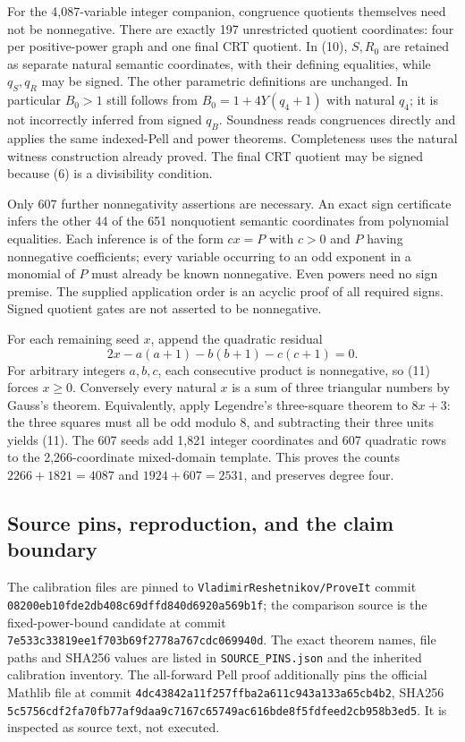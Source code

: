 \documentclass[11pt]{article}
\begin{document}
For the 4,087-variable integer companion, congruence quotients themselves
need not be nonnegative.  There are exactly 197 unrestricted quotient
coordinates: four per positive-power graph and one final CRT quotient.
In (10), $S,R_0$ are retained as separate natural semantic coordinates,
with their defining equalities, while $q_S,q_R$ may be signed.  The other
parametric definitions are unchanged.  In particular $B_0>1$ still follows
from $B_0=1+4Y(q_4+1)$ with natural $q_4$; it is not incorrectly inferred
from signed $q_B$.  Soundness reads congruences directly and applies the
same indexed-Pell and power theorems.  Completeness uses the natural
witness construction already proved.  The final CRT quotient may be
signed because (6) is a divisibility condition.

Only 607 further nonnegativity assertions are necessary.  An exact sign
certificate infers the other 44 of the 651 nonquotient semantic
coordinates from polynomial equalities.  Each inference is of the form
$c x=P$ with $c>0$ and $P$ having nonnegative coefficients; every variable
occurring to an odd exponent in a monomial of $P$ must already be known
nonnegative.  Even powers need no sign premise.  The supplied application
order is an acyclic proof of all required signs.  Signed quotient gates
are not asserted to be nonnegative.

For each remaining seed $x$, append the quadratic residual
\[
 2x-a(a+1)-b(b+1)-c(c+1)=0. \tag{11}
\]
For arbitrary integers $a,b,c$, each consecutive product is nonnegative,
so (11) forces $x\ge0$.  Conversely every natural $x$ is a sum of three
triangular numbers by Gauss's theorem.  Equivalently, apply Legendre's
three-square theorem to $8x+3$: the three squares must all be odd modulo
8, and subtracting their three units yields (11).
The 607 seeds add 1,821 integer coordinates and 607 quadratic rows to
the 2,266-coordinate mixed-domain template.  This proves the counts
$2266+1821=4087$ and $1924+607=2531$, and preserves degree four.

\subsection{Source pins, reproduction, and the claim boundary}

The calibration files are pinned to
\texttt{VladimirReshetnikov/ProveIt} commit
\nolinkurl{08200eb10fde2db408c69dffd840d6920a569b1f};
the comparison source is the fixed-power-bound candidate at commit
\nolinkurl{7e533c33819ee1f703b69f2778a767cdc069940d}.
The exact theorem names, file paths and SHA256 values are listed in
\texttt{SOURCE\_PINS.json} and the inherited calibration inventory.
The all-forward Pell proof additionally pins the official Mathlib file
at commit \nolinkurl{4dc43842a11f257ffba2a611c943a133a65cb4b2},
SHA256 \nolinkurl{5c5756cdf2fa70fb77af9daa9c7167c65749ac616bde8f5fdfeed2cb958b3ed5}.
It is inspected as source text, not executed.
\end{document}
